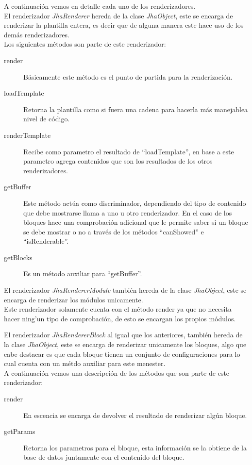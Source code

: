 A continuaci\'on vemos en detalle cada uno de los renderizadores.\\

El renderizador \textit{JhaRenderer} hereda de la clase \textit{JhaObject}, este se encarga de renderizar la plantilla entera, es decir que de alguna manera este hace uso de los dem\'as renderizadores.\\
Los siguientes m\'etodos son parte de este renderizador:
\begin{description}
\item[render] B\'asicamente este m\'etodo es el punto de partida para la renderizaci\'on.
\item[loadTemplate] Retorna la plantilla como si fuera una cadena para hacerla m\'as manejablea nivel de c\'odigo.
\item[renderTemplate] Recibe como parametro el resultado de ``loadTemplate'', en base a este parametro agrega contenidos que son los resultados de los otros renderizadores.
\item[getBuffer] Este m\'etodo act\'ua como discriminador, dependiendo del tipo de contenido que debe mostrarse llama a uno u otro renderizador. En el caso de los bloques hace una comprobaci\'on adicional que le permite saber si un bloque se debe mostrar o no a trav\'es de los m\'etodos ``canShowed'' e ``isRenderable''.
\item[getBlocks] Es un m\'etodo auxiliar para ``getBuffer''.
\end{description}



El renderizador \textit{JhaRendererModule} tambi\'en hereda de la clase \textit{JhaObject}, este se encarga de renderizar los m\'odulos unicamente.\\
Este renderizador solamente cuenta con el m\'etodo render ya que no necesita hacer ning'un tipo de comprobaci\'on, de esto se encargan los propios m\'odulos.



El renderizador \textit{JhaRendererBlock} al igual que los anteriores, tambi\'en hereda de la clase \textit{JhaObject}, este se encarga de renderizar unicamente los bloques, algo que cabe destacar es que cada bloque tienen un conjunto de configuraciones para lo cual cuenta con un m\'etdo auxiliar para este menester.\\
A continuaci\'on vemos una descripci\'on de los m\'etodos que son parte de este renderizador:
\begin{description}
\item[render] En escencia se encarga de devolver el resultado de renderizar alg\'un bloque.
\item[getParams] Retorna los parametros para el bloque, esta informaci\'on se la obtiene de la base de datos juntamente con el contenido del bloque.
\end{description}

